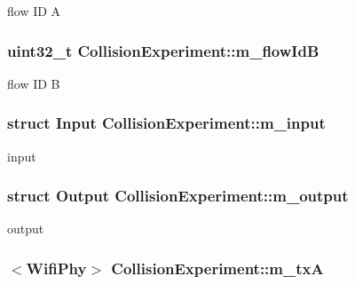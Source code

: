 flow ID A 

\subsubsection[{\texorpdfstring{m\+\_\+flow\+IdB}{m_flowIdB}}]{\setlength{\rightskip}{0pt plus 5cm}uint32\+\_\+t Collision\+Experiment\+::m\+\_\+flow\+IdB\hspace{0.3cm}{\ttfamily [private]}}\hypertarget{classCollisionExperiment_a39fe5cdf6536df540d308abba68c2c0a}{}\label{classCollisionExperiment_a39fe5cdf6536df540d308abba68c2c0a}


flow ID B 

\subsubsection[{\texorpdfstring{m\+\_\+input}{m_input}}]{\setlength{\rightskip}{0pt plus 5cm}struct {\bf Input} Collision\+Experiment\+::m\+\_\+input\hspace{0.3cm}{\ttfamily [private]}}\hypertarget{classCollisionExperiment_a735b0105c62702501ae9e4b473795682}{}\label{classCollisionExperiment_a735b0105c62702501ae9e4b473795682}


input 

\subsubsection[{\texorpdfstring{m\+\_\+output}{m_output}}]{\setlength{\rightskip}{0pt plus 5cm}struct {\bf Output} Collision\+Experiment\+::m\+\_\+output\hspace{0.3cm}{\ttfamily [private]}}\hypertarget{classCollisionExperiment_a5a7408505c713d02596f1657848e7666}{}\label{classCollisionExperiment_a5a7408505c713d02596f1657848e7666}


output 

\subsubsection[{\texorpdfstring{m\+\_\+txA}{m_txA}}]{$<${\bf Wifi\+Phy}$>$ Collision\+Experiment\+::m\+\_\+txA\hspace{0.3cm}{\ttfamily [private]}}\hypertarget{classCollisionExperiment_ae978d49d2fd4c040217934ed24852f53}{}\label{classCollisionExperiment_ae978d49d2fd4c040217934ed24852f53}


